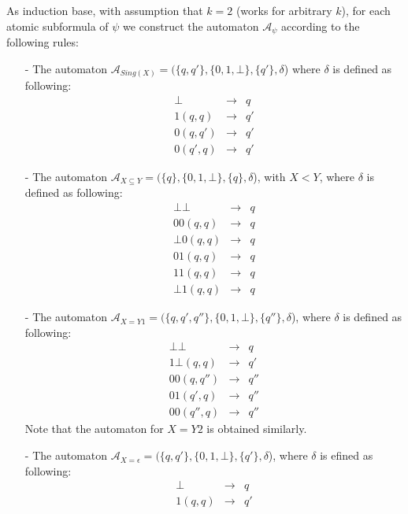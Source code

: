 As induction base, with assumption that $k = 2$ (works for arbitrary $k$), for each atomic subformula of $\psi$ we construct the automaton $\mathcal{A}_{\psi}$ according to the following rules:
\begin{itemize}
 \item[-] The automaton $\mathcal{A}_{Sing(X)} = (\{q, q'\}, \{0, 1, \bot\}, \{q'\}, \delta$) where $\delta$ is defined as following:
\begin{eqnarray*}
 \bot & \rightarrow & q\\
 1 (q, q) & \rightarrow & q'\\
 0 (q, q') & \rightarrow & q'\\
 0 (q', q) & \rightarrow & q'
\end{eqnarray*}
 \item[-] The automaton $\mathcal{A}_{X \subseteq Y} = (\{q\}, \{0, 1, \bot\}, \{q\}, \delta$), with $X < Y$, where $\delta$ is defined as following:
\begin{eqnarray*}
 \bot\bot & \rightarrow & q\\
 00 (q, q) & \rightarrow & q\\
 \bot 0 (q, q) & \rightarrow & q\\
 01 (q, q) & \rightarrow & q\\
 11 (q, q) & \rightarrow & q\\
 \bot1 (q, q) & \rightarrow & q
\end{eqnarray*}
 \item[-] The automaton $\mathcal{A}_{X = Y1} = (\{q, q', q''\}, \{0, 1, \bot\}, \{q''\}, \delta$), where $\delta$ is defined as following:
\begin{eqnarray*}
 \bot\bot & \rightarrow & q\\
 1\bot (q, q) & \rightarrow & q'\\
 00 (q, q'') & \rightarrow & q''\\
 01 (q', q) & \rightarrow & q''\\
 00 (q'', q) & \rightarrow & q''
\end{eqnarray*}
Note that the automaton for $X = Y2$ is obtained similarly.
 \item[-] The automaton $\mathcal{A}_{X = \epsilon} = (\{q, q'\}, \{0, 1,
 \bot\}, \{q'\}, \delta$), where $\delta$ is efined as following:
\begin{eqnarray*}
 \bot & \rightarrow & q\\
 1 (q, q) & \rightarrow & q'
\end{eqnarray*}
\end{itemize}


